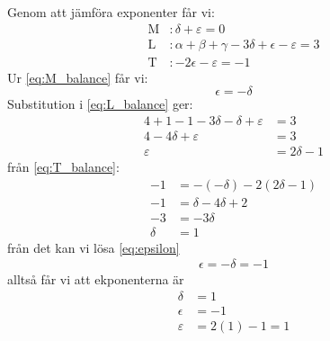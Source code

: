 \documentclass[a4paper,12pt]{article}
\begin{document}
%
Genom att jämföra exponenter får vi:
\begin{align}
    \mathrm{M}&: \delta + \varepsilon = 0 \label{eq:M_balance} \\
    \mathrm{L}&: \alpha + \beta + \gamma - 3\delta + \epsilon - \varepsilon = 3 \label{eq:L_balance} \\
    \mathrm{T}&: -2\epsilon - \varepsilon = -1 \label{eq:T_balance}
\end{align}
%
Ur \cref{eq:M_balance} får vi:
\begin{equation}
    \epsilon = -\delta \label{eq:epsilon}
\end{equation}
%
Substitution i \cref{eq:L_balance} ger:
\begin{align}
    4 + 1 - 1 - 3\delta - \delta + \varepsilon &= 3 \\
    4 - 4\delta + \varepsilon &= 3 \\
    \varepsilon &= 2\delta - 1
\end{align}
%
från \cref{eq:T_balance}:
\begin{align}
    -1 &= -(-\delta) - 2(2\delta - 1) \\
    -1 &= \delta - 4\delta + 2 \\
    -3 &= -3\delta \\
    \delta &= 1
\end{align}
%
från det kan vi lösa \cref{eq:epsilon}
\begin{align}
    \epsilon = -\delta = -1
\end{align}
alltså får vi att ekponenterna är
\begin{align}
    \delta &= 1 \\
    \epsilon &= -1 \\
    \varepsilon &= 2(1) - 1 = 1
\end{align}
\end{document}
